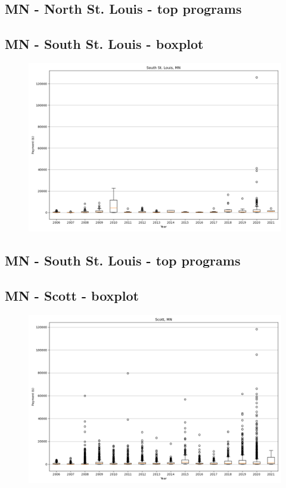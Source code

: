 \subsection*{MN - North St. Louis - top programs}

\newpage
\subsection*{MN - South St. Louis - boxplot}
\begin{figure}[h]
\centering
\includegraphics[width=7in]{../output/boxplots/counties/South St. Louis-MN_boxplot.png}
\end{figure}


\subsection*{MN - South St. Louis - top programs}

\newpage
\subsection*{MN - Scott - boxplot}
\begin{figure}[h]
\centering
\includegraphics[width=7in]{../output/boxplots/counties/Scott-MN_boxplot.png}
\end{figure}


